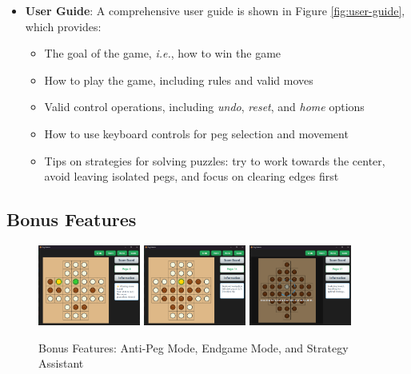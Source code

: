 \begin{itemize}
    \item \textbf{User Guide}: A comprehensive user guide is shown in Figure \ref{fig:user-guide}, which provides:
    \begin{itemize}
        \item The goal of the game, \emph{i.e.}, how to win the game
        \item How to play the game, including rules and valid moves
        \item Valid control operations, including \emph{undo}, \emph{reset}, and \emph{home} options
        \item How to use keyboard controls for peg selection and movement
        \item Tips on strategies for solving puzzles: try to work towards the center, avoid leaving isolated pegs, and focus on clearing edges first
    \end{itemize}
\end{itemize}

\subsection{Bonus Features}

\begin{figure}[tbp]
    \centering
    \includegraphics[width=0.3\textwidth]{resource/board-demos/AntiPegBoard.png}
    \includegraphics[width=0.3\textwidth]{resource/board-demos/EndgameBoard.png}
    \includegraphics[width=0.3\textwidth]{resource/StrategyAssistant.png}
    \caption{Bonus Features: Anti-Peg Mode, Endgame Mode, and Strategy Assistant}
    \label{fig:bonus-features}
\end{figure}

